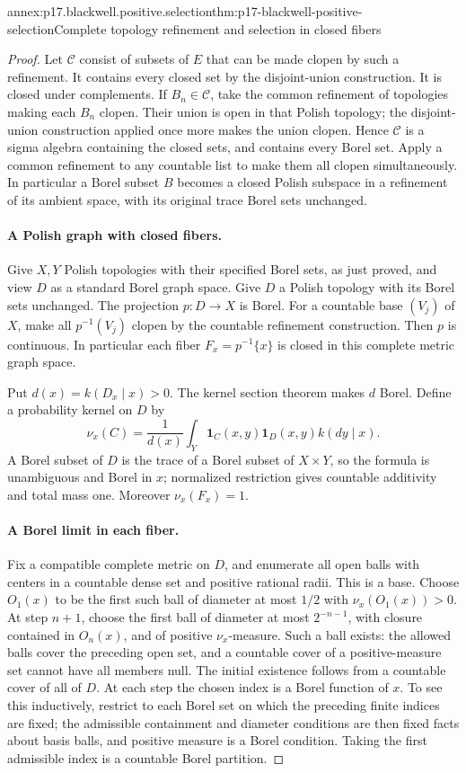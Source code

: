 \begin{annexitem}{annex:p17.blackwell.positive.selection}{thm:p17-blackwell-positive-selection}{Complete topology refinement and selection in closed fibers}
\begin{proof}
Let \(\mathcal C\) consist of subsets of \(E\) that can be
made clopen by such a refinement. It contains every closed
set by the disjoint-union construction. It is closed under
complements. If \(B_n\in\mathcal C\), take the common refinement
of topologies making each \(B_n\) clopen. Their union is open
in that Polish topology; the disjoint-union construction applied
once more makes the union clopen. Hence \(\mathcal C\) is a
sigma algebra containing the closed sets, and contains every
Borel set. Apply a common refinement to any countable list
to make them all clopen simultaneously.
In particular a Borel subset \(B\) becomes a closed Polish
subspace in a refinement of its ambient space, with its
original trace Borel sets unchanged.

\paragraph{A Polish graph with closed fibers.}
Give \(X,Y\) Polish topologies with their specified Borel sets,
as just proved, and view \(D\) as a standard Borel graph space.
Give \(D\) a Polish topology with its Borel sets unchanged.
The projection \(p:D\to X\) is Borel. For a countable base
\((V_j)\) of \(X\), make all \(p^{-1}(V_j)\) clopen by the
countable refinement construction. Then \(p\) is continuous.
In particular each fiber \(F_x=p^{-1}\{x\}\) is closed in this
complete metric graph space.

Put \(d(x)=k(D_x\mid x)>0\). The kernel section theorem
makes \(d\) Borel. Define a probability kernel on \(D\) by
\[
       \nu_x(C)=\frac{1}{d(x)}
           \int_Y\mathbf1_{C}(x,y)\mathbf1_D(x,y)k(dy\mid x).
\]
A Borel subset of \(D\) is the trace of a Borel subset of
\(X\times Y\), so the formula is unambiguous and Borel in
\(x\); normalized restriction gives countable additivity and
total mass one. Moreover \(\nu_x(F_x)=1\).

\paragraph{A Borel limit in each fiber.}
Fix a compatible complete metric on \(D\), and enumerate all
open balls with centers in a countable dense set and positive
rational radii. This is a base. Choose \(O_1(x)\) to be the
first such ball of diameter at most \(1/2\) with
\(\nu_x(O_1(x))>0\). At step \(n+1\), choose the first ball
of diameter at most \(2^{-n-1}\), with closure contained in
\(O_n(x)\), and of positive \(\nu_x\)-measure.
Such a ball exists: the allowed balls cover the preceding
open set, and a countable cover of a positive-measure set
cannot have all members null. The initial existence follows
from a countable cover of all of \(D\).
At each step the chosen index is a Borel function of \(x\).
To see this inductively, restrict to each Borel set on which
the preceding finite indices are fixed; the admissible
containment and diameter conditions are then fixed facts
about basis balls, and positive measure is a Borel condition.
Taking the first admissible index is a countable Borel partition.


\end{proof}
\end{annexitem}
